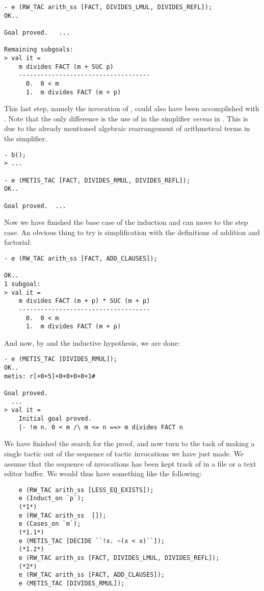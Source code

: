 \begin{session}
\begin{verbatim}
- e (RW_TAC arith_ss [FACT, DIVIDES_LMUL, DIVIDES_REFL]);
OK..

Goal proved.   ...

Remaining subgoals:
> val it =
    m divides FACT (m + SUC p)
    ------------------------------------
      0.  0 < m
      1.  m divides FACT (m + p)
\end{verbatim}
\end{session}
This last step, namely the invocation of ,
could also have been accomplished with . Note that
the only difference is the use of  in the simplifier
\emph{versus}  in . This is due to the
already mentioned algebraic rearrangement of arithmetical terms in the simplifier.
\begin{session}
\begin{verbatim}
- b();
> ...

- e (METIS_TAC [FACT, DIVIDES_RMUL, DIVIDES_REFL]);
OK..

Goal proved.  ...
\end{verbatim}
\end{session}
Now we have finished the base case of the induction and can move to the
step case. An obvious thing to try is simplification with the
definitions of addition and factorial:
\begin{session}
\begin{verbatim}
- e (RW_TAC arith_ss [FACT, ADD_CLAUSES]);

OK..
1 subgoal:
> val it =
    m divides FACT (m + p) * SUC (m + p)
    ------------------------------------
      0.  0 < m
      1.  m divides FACT (m + p)
\end{verbatim}
\end{session}
\noindent And now, by  and the inductive hypothesis, we are
done:
\begin{session}
\begin{verbatim}
- e (METIS_TAC [DIVIDES_RMUL]);
OK..
metis: r[+0+5]+0+0+0+0+1#

Goal proved.
  ...
> val it =
    Initial goal proved.
    |- !m n. 0 < m /\ m <= n ==> m divides FACT n
\end{verbatim}
\end{session}
We have finished the search for the proof, and now turn to the task of
making a single tactic out of the sequence of tactic invocations we have
just made. We assume that the sequence of invocations has been kept
track of in a file or a text editor buffer. We would thus have something
like the following:
\begin{hol}
\begin{verbatim}
    e (RW_TAC arith_ss [LESS_EQ_EXISTS]);
    e (Induct_on `p`);
    (*1*)
    e (RW_TAC arith_ss  []);
    e (Cases_on `m`);
    (*1.1*)
    e (METIS_TAC [DECIDE ``!x. ~(x < x)``]);
    (*1.2*)
    e (RW_TAC arith_ss [FACT, DIVIDES_LMUL, DIVIDES_REFL]);
    (*2*)
    e (RW_TAC arith_ss [FACT, ADD_CLAUSES]);
    e (METIS_TAC [DIVIDES_RMUL]);
\end{verbatim}
\end{hol}
\noindent

